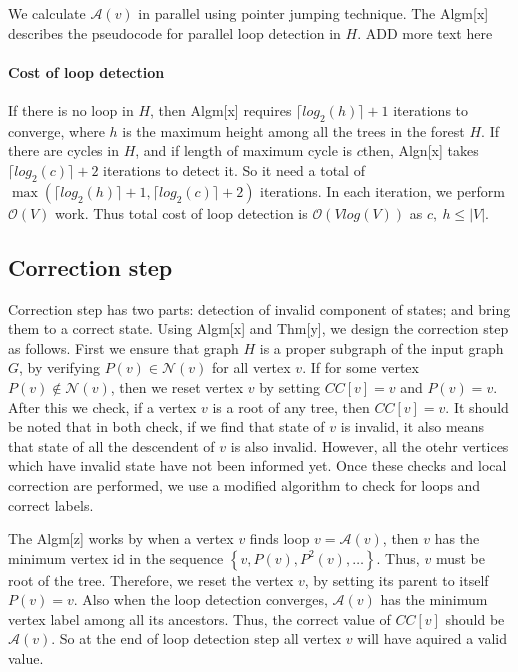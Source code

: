 We calculate $\mathcal{A}(v)$ in parallel using pointer jumping technique.
The Algm{[}x{]} describes the pseudocode for parallel loop detection
in $H$. ADD more text here

\paragraph*{Cost of loop detection}

If there is no loop in $H$, then Algm{[}x{]} requires $\lceil log_{2}(h)\rceil+1$
iterations to converge, where $h$ is the maximum height among all
the trees in the forest $H$. If there are cycles in $H$, and if
length of maximum cycle is $c$then, Algn{[}x{]} takes $\lceil log_{2}(c)\rceil+2$
iterations to detect it. So it need a total of $\max\left(\lceil log_{2}(h)\rceil+1,\lceil log_{2}(c)\rceil+2\right)$
iterations. In each iteration, we perform $\mathcal{O}(V)$ work.
Thus total cost of loop detection is $\mathcal{O}(Vlog(V))$ as $c,\ h\leq|V|$. 

\subsection{Correction step}

Correction step has two parts: detection of invalid component of states;
and bring them to a correct state. Using Algm{[}x{]} and Thm{[}y{]},
we design the correction step as follows. First we ensure that graph
$H$ is a proper subgraph of the input graph $G$, by verifying $P(v)\in\mathcal{N}(v)$
for all vertex $v$. If for some vertex $P(v)\notin\mathcal{N}(v)$,
then we reset vertex $v$ by setting $CC[v]=v$ and $P(v)=v$. After
this we check, if a vertex $v$ is a root of any tree, then $CC[v]=v$.
It should be noted that in both check, if we find that state of $v$
is invalid, it also means that state of all the descendent of $v$
is also invalid. However, all the otehr vertices which have invalid
state have not been informed yet. Once these checks and local correction
are performed, we use a modified algorithm to check for loops and
correct labels. 

\begin{algorithm}
\caption{}
\end{algorithm}

The Algm{[}z{]} works by when a vertex $v$ finds loop $v=\mathcal{A}(v)$,
then $v$ has the minimum vertex id in the sequence $\left\{ v,P(v),P^{2}(v),\ldots\right\} $.
Thus, $v$ must be root of the tree. Therefore, we reset the vertex
$v$, by setting its parent to itself $P(v)=v$. Also when the loop
detection converges, $\mathcal{A}(v)$ has the minimum vertex label
among all its ancestors. Thus, the correct value of $CC[v]$ should
be $\mathcal{A}(v)$. So at the end of loop detection step all vertex
$v$ will have aquired a valid value. 

